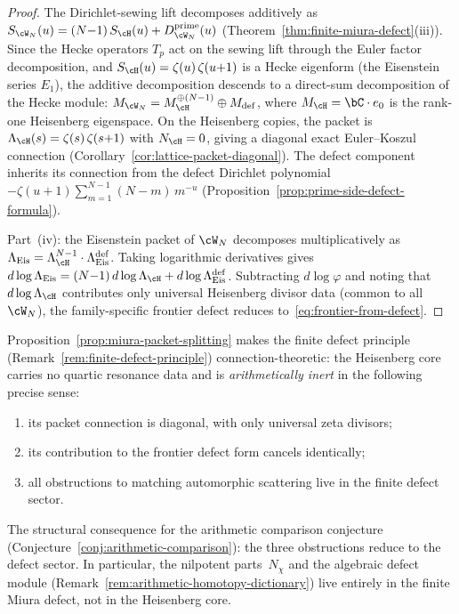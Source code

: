\begin{proof}
The Dirichlet-sewing lift decomposes additively as
$S_{\cW_N}(u) = (N{-}1)\,S_\cH(u) +
D_{\cW_N}^{\mathrm{prime}}(u)$
(Theorem~\ref{thm:finite-miura-defect}(iii)).
Since the Hecke operators $T_p$ act on the sewing lift
through the Euler factor decomposition, and
$S_\cH(u) = \zeta(u)\,\zeta(u{+}1)$ is a Hecke eigenform
(the Eisenstein series $E_1$), the additive decomposition
descends to a direct-sum decomposition of the Hecke module:
$M_{\cW_N} = M_\cH^{\oplus(N-1)} \oplus M_{\mathrm{def}}$,
where $M_\cH = \bC\cdot e_0$ is the rank-one Heisenberg
eigenspace.
On the Heisenberg copies, the packet
is $\Lambda_\cH(s) = \zeta(s)\,\zeta(s{+}1)$ with
$N_\cH = 0$, giving a diagonal exact Euler--Koszul
connection (Corollary~\ref{cor:lattice-packet-diagonal}).
The defect component inherits its connection from the
defect Dirichlet polynomial
$-\zeta(u{+}1)\sum_{m=1}^{N-1}(N{-}m)\,m^{-u}$
(Proposition~\ref{prop:prime-side-defect-formula}).

Part~(iv): the Eisenstein packet of $\cW_N$ decomposes
multiplicatively as
$\Lambda_{\mathrm{Eis}} = \Lambda_\cH^{N-1} \cdot
\Lambda_{\mathrm{Eis}}^{\mathrm{def}}$.
Taking logarithmic derivatives gives
$d\log\Lambda_{\mathrm{Eis}}
= (N{-}1)\,d\log\Lambda_\cH
+ d\log\Lambda_{\mathrm{Eis}}^{\mathrm{def}}$.
Subtracting $d\log\varphi$ and noting that
$d\log\Lambda_\cH$ contributes only universal
Heisenberg divisor data (common to all $\cW_N$),
the family-specific frontier defect reduces
to~\eqref{eq:frontier-from-defect}.
\end{proof}

\begin{remark}%
\label{rem:heisenberg-inert}%
%
Proposition~\ref{prop:miura-packet-splitting} makes the
finite defect principle
(Remark~\ref{rem:finite-defect-principle}) connection-theoretic:
the Heisenberg core carries no quartic resonance data and is
\emph{arithmetically inert} in the following precise sense:
\begin{enumerate}[label=\textup{(\roman*)}]
\item its packet connection is diagonal, with only universal
 zeta divisors;
\item its contribution to the frontier defect form
 cancels identically;
\item all obstructions to matching automorphic scattering
 live in the finite defect sector.
\end{enumerate}
The structural consequence for the arithmetic comparison
conjecture
(Conjecture~\ref{conj:arithmetic-comparison}):
the three obstructions reduce to the defect sector.
In particular, the nilpotent parts~$N_\chi$ and the
algebraic defect module
(Remark~\ref{rem:arithmetic-homotopy-dictionary})
live entirely in the finite Miura defect, not in the
Heisenberg core.
\end{remark}

